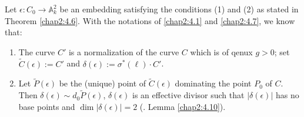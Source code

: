 \begin{proofoftheorem*}[4.6 ]
  Let $\epsilon:C_{0}\to \mathbb{A}^{2}_{k}$ be an embedding satisfying
  the conditions (1) and (2) as stated in Theorem \ref{chap2:4.6}. With the
  notations of \ref{chap2:4.1} and \ref{chap2:4.7}, we know that:
  \begin{enumerate}
    \renewcommand{\labelenumi}{\theenumi$^{\circ}$}
  \item The curve $C'$ is a normalization of the curve $C$ which is of
    qenux $g>0$; set $\widetilde{C}(\epsilon):=C'$ and
    $\delta(\epsilon):=\sigma^{\ast}(\ell)\cdot C'$.
    
  \item Let $\widetilde{P}(\epsilon)$ be the (unique) point of
    $\widetilde{C}(\epsilon)$ dominating the point $P_{0}$ of $C$. Then
    $\delta(\epsilon)\sim d_{0}\widetilde{P}(\epsilon)$,
    $\delta(\epsilon)$ is an effective divisor such that
    $|\delta(\epsilon)|$ has no base points and
    $\dim|\delta(\epsilon)|=2$ (\cf. Lemma \ref{chap2:4.10}).
    

\end{enumerate}
\end{proofoftheorem*}

